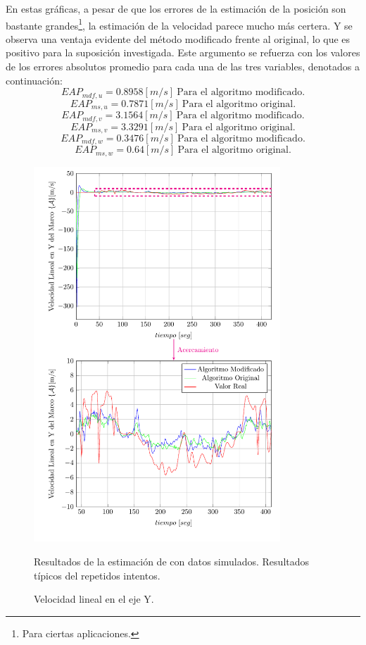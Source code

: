 \documentclass[conference]{IEEEtran}
\begin{document}
En estas gráficas, a pesar de que los errores de la estimación de la posición son bastante grandes\footnote{Para ciertas aplicaciones.}, la estimación de la velocidad parece mucho más certera. Y se observa una ventaja evidente del método modificado frente al original, lo que es positivo para la suposición investigada. Este argumento se refuerza con los valores de los errores absolutos promedio para cada una de las tres variables, denotados a continuación:
\begin{equation*}
EAP_{mdf,u}=0.8958 [m/s]~\text{Para el algoritmo modificado.}
\end{equation*}
\begin{equation*}
EAP_{ms,u}=0.7871 [m/s]~\text{Para el algoritmo original.}
\end{equation*}
\begin{equation*}
EAP_{mdf,v}=3.1564 [m/s]~\text{Para el algoritmo modificado.}
\end{equation*}
\begin{equation*}
EAP_{ms,v}=3.3291 [m/s]~\text{Para el algoritmo original.}
\end{equation*}
\begin{equation*}
EAP_{mdf,w}=0.3476 [m/s]~\text{Para el algoritmo modificado.}
\end{equation*}
\begin{equation*}
EAP_{ms,w}=0.64 [m/s]~\text{Para el algoritmo original.}
\end{equation*}
\begin{figure}
\begin{center}
\includegraphics[width=25em]
{PlotV.pdf}
\caption{Velocidad lineal en el eje Y.}
\scriptsize{Resultados de la estimación de con datos simulados. Resultados típicos del repetidos intentos.}
\label{PlotV1}
\end{center}
\end{figure}
\end{document}
